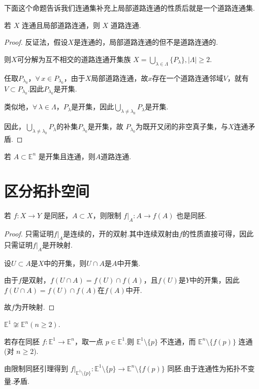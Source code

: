 下面这个命题告诉我们连通集补充上局部道路连通的性质后就是一个道路连通集.
\begin{proposition}[连通且局部道路连通蕴含道路连通][prop:7.6]
    若 $X$ 连通且局部道路连通，则 $X$ 道路连通.
\end{proposition}
\begin{proof}
    反证法，假设$X$是连通的，局部道路连通的但不是道路连通的.\par
    则$X$可分解为互不相交的道路连通开集族 $X=\bigcup_{\lambda\in\Lambda}\{P_\lambda\},|\Lambda|\geq 2$.\par
    任取$P_{\lambda_0}$，$\forall\, x\in P_{\lambda_0}$，由于$X$局部道路连通，故$x$存在一个道路连通邻域$V$，就有$V\subset P_{\lambda_0}$.因此$P_{\lambda_0}$是开集.\par
    类似地，$\forall\,\lambda\in\Lambda$，$P_\lambda$是开集，因此$\bigcup_{\lambda\neq\lambda_0}{P_\lambda}$是开集.\par
    因此，$\bigcup_{\lambda\neq\lambda_0}{P_\lambda}$的补集$P_{\lambda_0}$是开集，故 $P_{\lambda_0}$为既开又闭的非空真子集，与$X$连通矛盾.
\end{proof}

\begin{corollary}[][cor:7.2]
    若 $A\subset \mathbb{E}^n$ 是开集且连通，则$A$道路连通.
\end{corollary}

\section{区分拓扑空间}

\begin{lemma}[限制仍为同胚][lem:7.10]
    若 $f:X\to Y$ 是同胚，$A\subset X$，则限制 $f|_A:A\to f(A)$ 也是同胚.
\end{lemma}
\begin{proof}
    只需证明$f|_A$是连续的，开的双射.其中连续双射由$f$的性质直接可得，因此只需证明$f|_A$是开映射.\par
    设$U\subset A$是$X$中的开集，则$U\cap A$是$A$中开集.\par
    由于$f$是双射，$f(U\cap A)=f(U)\cap f(A)$，且$f(U)$是$Y$中的开集，因此$f(U\cap A)=f(U)\cap f(A)$在$f(A)$中开.\par
    故$f$为开映射.
\end{proof}

\begin{instance}
    $\mathbb{E}^1\not\cong \mathbb{E}^n$$(n\geq 2)$.\par
    若存在同胚 $f: \mathbb{E}^1\to\mathbb{E}^n$，取一点 $p\in \mathbb{E}^1$.则 $\mathbb{E}^1\setminus\{p\}$ 不连通，而 $\mathbb{E}^n\setminus\{f(p)\}$ 连通(对 $n\geq 2$).\par
    由限制同胚引理得到 $f|_{\mathbb{E}^1\setminus\{p\}}:\mathbb{E}^1\setminus\{p\}\to \mathbb{E}^n\setminus\{f(p)\}$ 同胚.由于连通性为拓扑不变量.矛盾.
\end{instance}

